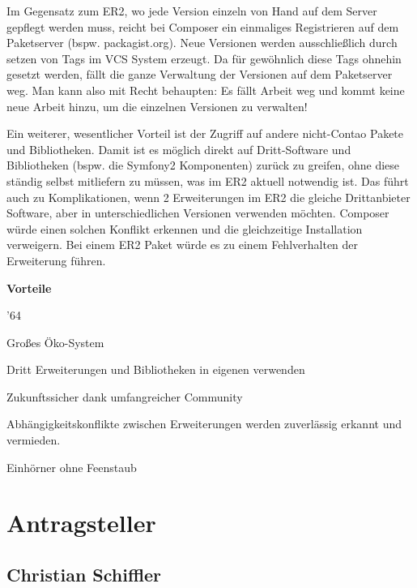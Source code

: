\documentclass[
paper=a4,
draft=false,%
fontsize=10pt%
]{scrartcl}
\begin{document}
Im Gegensatz zum ER2, wo jede Version einzeln von Hand auf dem Server gepflegt werden muss, reicht bei Composer ein einmaliges Registrieren auf dem Paketserver (bspw. packagist.org). Neue Versionen werden ausschließlich durch setzen von Tags im VCS System erzeugt. Da für gewöhnlich diese Tags ohnehin gesetzt werden, fällt die ganze Verwaltung der Versionen auf dem Paketserver weg. Man kann also mit Recht behaupten: Es fällt Arbeit weg und kommt keine neue Arbeit hinzu, um die einzelnen Versionen zu verwalten!

Ein weiterer, wesentlicher Vorteil ist der Zugriff auf andere nicht-Contao Pakete und Bibliotheken. Damit ist es möglich direkt auf Dritt-Software und Bibliotheken (bspw. die Symfony2 Komponenten) zurück zu greifen, ohne diese ständig selbst mitliefern zu müssen, was im ER2 aktuell notwendig ist. Das führt auch zu Komplikationen, wenn 2 Erweiterungen im ER2 die gleiche Drittanbieter Software, aber in unterschiedlichen Versionen verwenden möchten. Composer würde einen solchen Konflikt erkennen und die gleichzeitige Installation verweigern. Bei einem ER2 Paket würde es zu einem Fehlverhalten der Erweiterung führen.

\textbf{Vorteile}
\begin{dinglist}{'64}
\item Großes Öko-System
\item Dritt Erweiterungen und Bibliotheken in eigenen verwenden
\item Zukunftssicher dank umfangreicher Community
\item Abhängigkeitskonflikte zwischen Erweiterungen werden zuverlässig erkannt und vermieden.
\item Einhörner ohne Feenstaub
\end{dinglist}

%
%

\newpage

\section{Antragsteller}

\subsection*{Christian  Schiffler}
\end{document}
